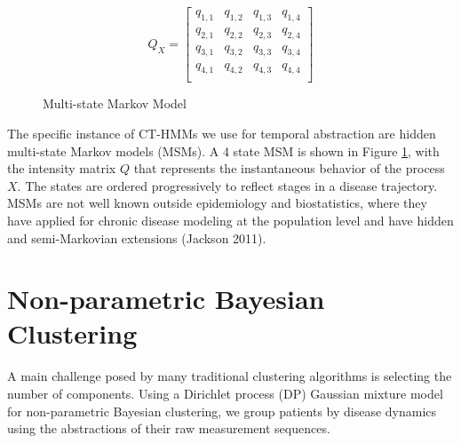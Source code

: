 \documentclass[letterpaper]{article}
\begin{document}
\begin{figure}[h!]
\begin{center}
\[
Q_X =
  \begin{bmatrix}
    q_{1,1} & q_{1,2} & q_{1,3} & q_{1,4}\\
    q_{2,1} & q_{2,2} & q_{2,3} & q_{2,4}\\
    q_{3,1} & q_{3,2} & q_{3,3} & q_{3,4}\\
    q_{4,1} & q_{4,2} & q_{4,3} & q_{4,4}\\
  \end{bmatrix}
\]
\end{center}
\caption{Multi-state Markov Model}
\label{fig:msm}
\end{figure}

The specific instance of CT-HMMs we use for temporal abstraction are hidden multi-state Markov models (MSMs).  A 4 state MSM is shown in Figure \ref{fig:msm}, with the intensity matrix $Q$ that represents the instantaneous behavior of the process $X$.  The states are ordered progressively to reflect stages in a disease trajectory.   MSMs are not well known outside epidemiology and biostatistics, where they have applied for chronic disease modeling at the population level and have hidden and semi-Markovian extensions (Jackson 2011).

\noindent
\section{Non-parametric Bayesian Clustering}
\noindent
A main challenge posed by many traditional clustering algorithms is selecting the number of components.  Using a Dirichlet process (DP) Gaussian mixture model for non-parametric Bayesian clustering, we group patients by disease dynamics using the abstractions of their raw measurement sequences.
\end{document}
